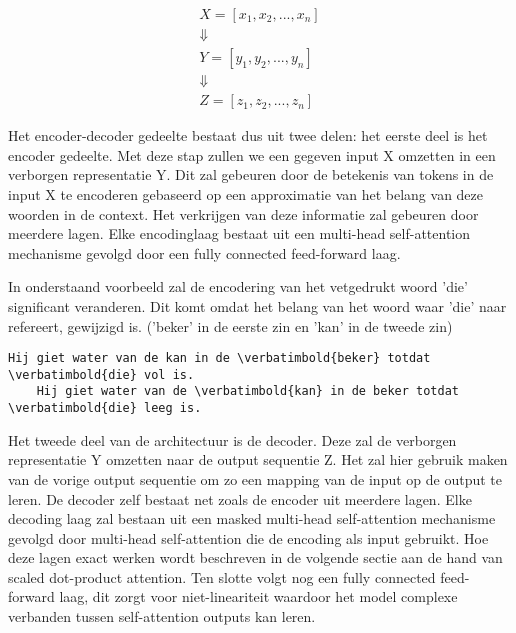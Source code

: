 \begin{equation}
\begin{split}
X = [x_1, x_2, ..., x_n]  \\
\Downarrow \;\;\;\;\;\;\;\;\;\;\;\;\;\;\; \\
Y = [y_1, y_2, ..., y_n] \\
\Downarrow \;\;\;\;\;\;\;\;\;\;\;\;\;\;\; \\
Z = [z_1, z_2, ..., z_n]
\end{split}
\end{equation}
\label{def:chapt2_transformers_encoder_decoder}    


Het encoder-decoder gedeelte bestaat dus uit twee delen: het eerste deel is het encoder gedeelte. Met deze stap zullen we een gegeven input X omzetten in een verborgen representatie Y. Dit zal gebeuren door de betekenis van tokens in de input X te encoderen gebaseerd op een approximatie van het belang van deze woorden in de context. Het verkrijgen van deze informatie zal gebeuren door meerdere lagen. Elke encodinglaag bestaat uit een multi-head self-attention mechanisme gevolgd door een fully connected feed-forward laag.     

In onderstaand voorbeeld zal de encodering van het vetgedrukt woord 'die' significant veranderen. Dit komt omdat het belang van het woord waar 'die' naar refereert, gewijzigd is. ('beker' in de eerste zin en 'kan' in de tweede zin)

\begin{Verbatim}[commandchars=\\\{\}]
    Hij giet water van de kan in de \verbatimbold{beker} totdat \verbatimbold{die} vol is.
    Hij giet water van de \verbatimbold{kan} in de beker totdat \verbatimbold{die} leeg is.
\end{Verbatim}

Het tweede deel van de architectuur is de decoder. Deze zal de verborgen representatie Y omzetten naar de output sequentie Z. Het zal hier gebruik maken van de vorige output sequentie om zo een mapping van de input op de output te leren. De decoder zelf bestaat net zoals de encoder uit meerdere lagen. Elke decoding laag zal bestaan uit een masked multi-head self-attention mechanisme gevolgd door multi-head self-attention die de encoding als input gebruikt. Hoe deze lagen exact werken wordt beschreven in de volgende sectie aan de hand van scaled dot-product attention. Ten slotte volgt nog een fully connected feed-forward laag, dit zorgt voor niet-lineariteit waardoor het model complexe verbanden tussen self-attention outputs kan leren. 


